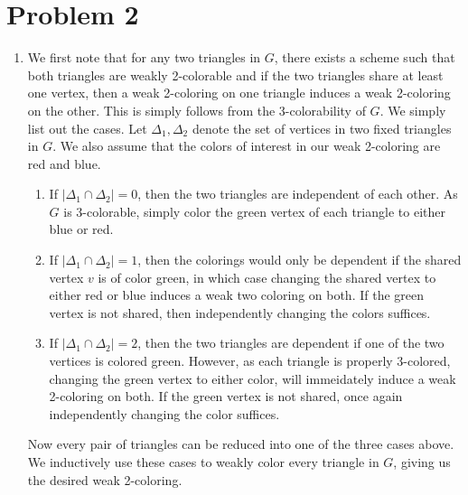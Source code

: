 \documentclass[12pt]{article}%
\begin{document}
\newpage
\section*{Problem 2}
\begin{enumerate}
  \item We first note that for any two triangles in $G$, there exists a scheme such that both triangles are weakly 2-colorable and if the two triangles share at least one vertex, then a weak 2-coloring on one triangle induces a weak 2-coloring on the other. This is simply follows from the 3-colorability of $G$. We simply list out the cases. Let $\Delta_1,\Delta_2$ denote the set of vertices in two fixed triangles in $G$. We also assume that the colors of interest in our weak 2-coloring are red and blue.
  \begin{enumerate}
    \item If $|\Delta_1 \cap \Delta_2| = 0$, then the two triangles are independent of each other. As $G$ is 3-colorable, simply color the green vertex of each triangle to either blue or red.
    \item If $|\Delta_1 \cap \Delta_2| = 1$, then the colorings would only be dependent if the shared vertex $v$ is of color green, in which case changing the shared vertex to either red or blue induces a weak two coloring on both. If the green vertex is not shared, then independently changing the colors suffices.
    \item If $|\Delta_1 \cap \Delta_2| = 2$, then the two triangles are dependent if one of the two vertices is colored green. However, as each triangle is properly 3-colored, changing the green vertex to either color, will immeidately induce a weak 2-coloring on both. If the green vertex is not shared, once again independently changing the color suffices.
  \end{enumerate}
  Now every pair of triangles can be reduced into one of the three cases above. We inductively use these cases to weakly color every triangle in $G$, giving us the desired weak 2-coloring.


\end{enumerate}
\end{document}
